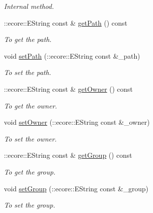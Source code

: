 \begin{DoxyCompactItemize}
\begin{DoxyCompactList}\small\item\em Internal method. \item\end{DoxyCompactList}\item 
::ecore::EString const \& \hyperlink{classFMS__Data_1_1DirEntry_a68333891d637b20e6c5483a5419c008b}{getPath} () const 
\begin{DoxyCompactList}\small\item\em To get the path. \item\end{DoxyCompactList}\item 
void \hyperlink{classFMS__Data_1_1DirEntry_a29c51b129de88474f1b21094093d3ffa}{setPath} (::ecore::EString const \&\_\-path)
\begin{DoxyCompactList}\small\item\em To set the path. \item\end{DoxyCompactList}\item 
::ecore::EString const \& \hyperlink{classFMS__Data_1_1DirEntry_a3ffbe22fe002faaaf1f79d32151c37b3}{getOwner} () const 
\begin{DoxyCompactList}\small\item\em To get the owner. \item\end{DoxyCompactList}\item 
void \hyperlink{classFMS__Data_1_1DirEntry_ad3d365ce0037b35f955980e1b7ad5530}{setOwner} (::ecore::EString const \&\_\-owner)
\begin{DoxyCompactList}\small\item\em To set the owner. \item\end{DoxyCompactList}\item 
::ecore::EString const \& \hyperlink{classFMS__Data_1_1DirEntry_a43ddd65ad891c5f84eab1014c25ba3b4}{getGroup} () const 
\begin{DoxyCompactList}\small\item\em To get the group. \item\end{DoxyCompactList}\item 
void \hyperlink{classFMS__Data_1_1DirEntry_a33421c32768e60330e26d45b7794cd2c}{setGroup} (::ecore::EString const \&\_\-group)
\begin{DoxyCompactList}\small\item\em To set the group. \item\end{DoxyCompactList}\item 

\end{DoxyCompactItemize}
